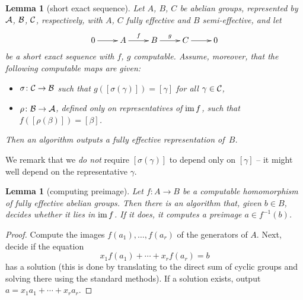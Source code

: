 \documentclass[12pt,a4wide]{article}
\theoremstyle{plain}
\newtheorem{lemma}[thm]{Lemma}
\theoremstyle{definition}
\renewcommand\:{\colon}
\begin{document}
\begin{lemma}[short exact sequence]\label{l:ses}
Let $A$, $B$, $C$ be abelian groups, represented by $\mathcal A$, $\mathcal B$, $\mathcal C$, respectively, with $A$, $C$ fully effective and $B$ semi-effective, and let
\[\xymatrix{0 \ar[r]& A \ar[r]^{f} & B \ar[r]^{g} & C \ar[r]&0}\]
be a short exact sequence with $f$, $g$ computable. Assume, moreover, that the following computable maps are given:
\begin{itemize}
\item
$\sigma \colon \mathcal C \to \mathcal B$ such that $g([\sigma(\gamma)])=[\gamma]$ for all $\gamma \in \mathcal C$,
\item
$\rho \colon \mathcal B \to \mathcal A$, defined only on representatives of $\mathop\mathrm{im}\nolimits f$, such that $f([\rho(\beta)])=[\beta]$.
\end{itemize}
Then an algorithm outputs a fully effective representation of~$B$.
\end{lemma}

We remark that we \emph{do not} require  $[\sigma(\gamma)]$ to depend only on $[\gamma]$ -- it might well depend on the representative $\gamma$.

\begin{lemma}[computing preimage]\label{l:preimage}
Let $f \colon A \to B$ be a computable homomorphism of fully effective abelian groups. Then there is an algorithm that, given $b \in B$, decides whether it lies in $\mathop\mathrm{im}\nolimits f$. If it does, it computes a preimage $a \in f^{-1}(b)$.
\end{lemma}

\begin{proof}
Compute the images $f(a_1), \ldots, f(a_r)$ of the generators of $A$. Next, decide if the equation
\[x_1 f(a_1) + \cdots + x_r f(a_r) = b\]
has a solution (this is done by translating to the direct sum of cyclic groups and solving there using the standard methods). If a solution exists, output $a = x_1 a_1 + \cdots + x_r a_r$.
\end{proof}
\end{document}
